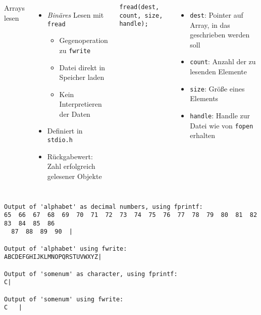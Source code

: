 \begin{frame}[fragile]
%
\begin{columns}[T]
\begin{Large}
Arrays lesen
\vspace{10pt}
\end{Large}
%
\begin{itemize}
\item \emph{Binäres} Lesen mit \texttt{fread}
\begin{itemize}
	\item Gegenoperation zu \texttt{fwrite}
	\item Datei direkt in Speicher laden
	\item Kein Interpretieren der Daten
\end{itemize}
\item Definiert in \texttt{stdio.h}
\item Rückgabewert: Zahl erfolgreich gelesener Objekte
\end{itemize}
%
\begin{codebox}[Syntax]
\begin{verbatim}
fread(dest, count, size, handle);
\end{verbatim}
\end{codebox}
%
\begin{itemize}
\item \texttt{dest}: Pointer auf Array, in das geschrieben werden soll
\item \texttt{count}: Anzahl der zu lesenden Elemente
\item \texttt{size}: Größe eines Elements
\item \texttt{handle}: Handle zur Datei wie von \texttt{fopen} erhalten
\end{itemize}
\end{columns}
%
\end{frame}


\begin{frame}[fragile]
%
\begin{cmdbox}[Quelldatei]
\begin{verbatim}
Output of 'alphabet' as decimal numbers, using fprintf:
65  66  67  68  69  70  71  72  73  74  75  76  77  78  79  80  81  82  83  84  85  86
  87  88  89  90  |

Output of 'alphabet' using fwrite:
ABCDEFGHIJKLMNOPQRSTUVWXYZ|

Output of 'somenum' as character, using fprintf:
C|

Output of 'somenum' using fwrite:
C   |
\end{verbatim}
\end{cmdbox}
%
\end{frame}

